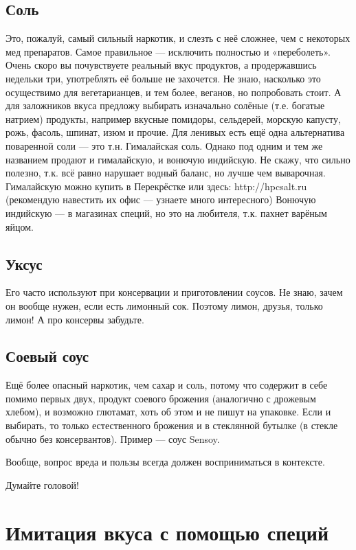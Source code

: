\subsection{Соль}

Это, пожалуй, самый сильный наркотик, и слезть с неё сложнее, чем с некоторых мед препаратов. Самое правильное — исключить полностью и «переболеть». Очень скоро вы почувствуете реальный вкус продуктов, а продержавшись недельки три, употреблять её больше не захочется. Не знаю, насколько это осуществимо для вегетарианцев, и тем более, веганов, но попробовать стоит.
А для заложников вкуса предложу выбирать изначально солёные (т.е. богатые натрием) продукты, например вкусные помидоры, сельдерей, морскую капусту, рожь, фасоль, шпинат, изюм и прочие.
Для ленивых есть ещё одна альтернатива поваренной соли — это т.н. Гималайская соль. Однако под одним и тем же названием продают и гималайскую, и вонючую индийскую. Не скажу, что сильно полезно, т.к. всё равно нарушает водный баланс, но лучше чем выварочная.
Гималайскую можно купить в Перекрёстке или здесь: http://hpcsalt.ru (рекомендую навестить их офис — узнаете много интересного)
Вонючую индийскую — в магазинах специй, но это на любителя, т.к. пахнет варёным яйцом.

\subsection{Уксус}

Его часто используют при консервации и приготовлении соусов. Не знаю, зачем он вообще нужен, если есть лимонный сок. Поэтому лимон, друзья, только лимон! А про консервы забудьте.

\subsection{Соевый соус}

Ещё более опасный наркотик, чем сахар и соль, потому что содержит в себе помимо первых двух, продукт соевого брожения (аналогично с дрожевым хлебом), и возможно глютамат, хоть об этом и не пишут на упаковке. Если и выбирать, то только естественного брожения и в стеклянной бутылке (в стекле обычно без консервантов). Пример — соус Sensoy.

Вообще, вопрос вреда и пользы всегда должен восприниматься в контексте. 

Думайте головой!

\section{Имитация вкуса с помощью специй}


